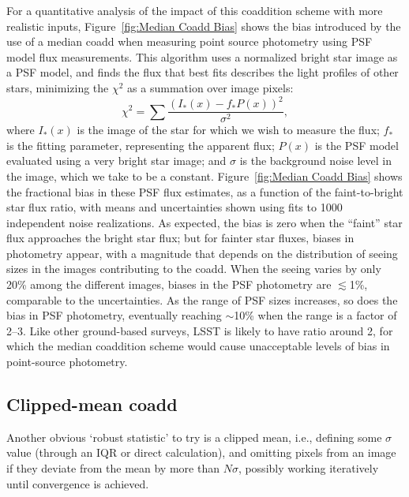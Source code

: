 \documentclass{aastex63}
\begin{document}
For a quantitative analysis of the impact of this coaddition scheme with more realistic inputs, Figure~\ref{fig:Median Coadd Bias} shows the bias introduced by the use of a median coadd when measuring point source photometry using PSF model flux measurements.
This algorithm uses a normalized bright star image as a PSF model, and finds the flux that best fits describes the light profiles of other stars, minimizing the $\chi^2$ as a summation over image pixels:
\begin{equation}
\chi^2 = \sum \frac{(I_*(x)-f_*P(x))^2}{\sigma^2},
\end{equation} 
where $I_*(x)$ is the image of the star for which we wish to measure the flux; $f_*$ is the fitting parameter, representing the apparent flux; $P(x)$ is the PSF model evaluated using a very bright star image; and  $\sigma$ is the background noise level in the image, which we take to be a constant.   Figure~\ref{fig:Median Coadd Bias} shows the fractional bias in these PSF flux estimates, as a function of the faint-to-bright star flux ratio, with means and uncertainties shown using fits to 1000 independent noise realizations.  
As expected, the bias is zero when the ``faint'' star flux approaches the bright star flux; but for fainter star fluxes,  biases in photometry appear, with a magnitude that depends on the distribution of seeing sizes in the images contributing to the coadd. When the seeing varies by only 20\% among the different images, biases in the PSF photometry are $\lesssim$1\%, comparable to the uncertainties. As the range of PSF sizes increases, so does the bias in PSF photometry, eventually reaching $\sim$10\% when the range is a factor of 2--3. Like other ground-based surveys, LSST is likely to have ratio around 2, for which the median coaddition scheme would cause unacceptable levels of bias in point-source photometry.


\subsection{Clipped-mean coadd}

Another obvious `robust statistic' to try is a clipped mean, i.e., defining some $\sigma$ value (through an IQR or direct calculation), and omitting pixels from an image if they deviate from the mean by more than $N\sigma$, possibly working iteratively until convergence is achieved.
\end{document}
